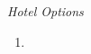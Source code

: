 \documentclass{article}
\begin{document}
	{\centering \emph{Hotel Options}
	
	}
	\begin{enumerate}
		\item \parbox{3cm}{\blindtext}
	\end{enumerate}
\end{document}
